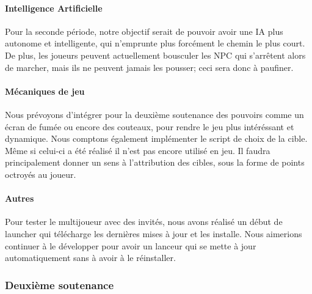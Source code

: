         \paragraph{Intelligence Artificielle}

            Pour la seconde période, notre objectif serait de pouvoir avoir une IA plus autonome et intelligente, qui n'emprunte plus forcément le chemin le plus court. 
            De plus, les joueurs peuvent actuellement bousculer les NPC qui s'arrêtent alors de marcher, mais ils ne peuvent jamais les pousser; 
            ceci sera donc à paufiner.

        \paragraph{Mécaniques de jeu}

            Nous prévoyons d'intégrer pour la deuxième soutenance des pouvoirs 
            comme un écran de fumée ou encore des couteaux, 
            pour rendre le jeu plus intéréssant et dynamique. 
            Nous comptons également implémenter le script de choix de la cible. 
            Même si celui-ci a été réalisé il n'est pas encore utilisé en jeu. 
            Il faudra principalement donner un sens à l'attribution des cibles, 
            sous la forme de points octroyés au joueur.

        \paragraph{Autres}

            Pour tester le multijoueur avec des invités, nous avons réalisé 
            un début de launcher qui télécharge les dernières mises à jour et les installe.
            Nous aimerions continuer à le développer pour avoir un lanceur
            qui se mette à jour automatiquement sans à avoir à le réinstaller.


    \vspace{0.5cm}
    \subsubsection{Deuxième soutenance}
    \vspace{0.5cm}

